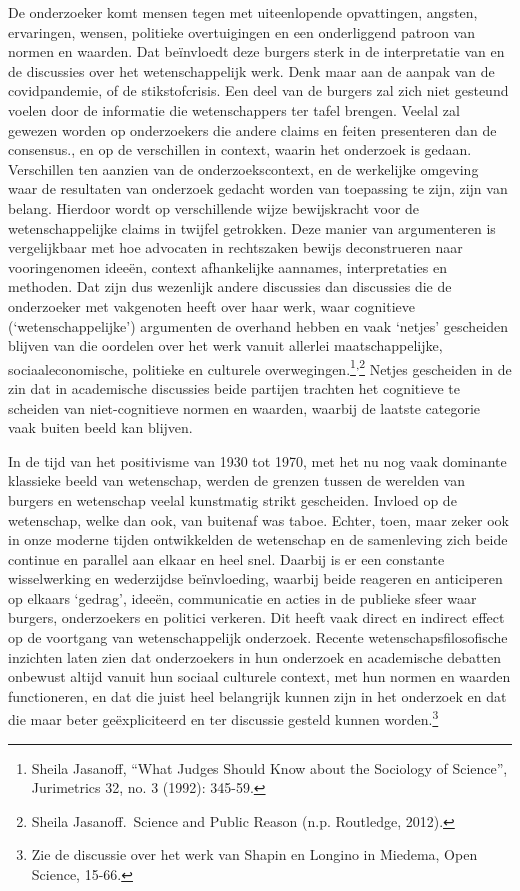 \documentclass[empirical, authordate, ]{new-jote-article}
\begin{document}
	De onderzoeker komt mensen tegen met uiteenlopende opvattingen, angsten, ervaringen, wensen, politieke overtuigingen en een onderliggend patroon van normen en waarden. Dat beïnvloedt deze burgers sterk in de interpretatie van en de discussies over het wetenschappelijk werk. Denk maar aan de aanpak van de covidpandemie, of de stikstofcrisis. Een deel van de burgers zal zich niet gesteund voelen door de informatie die wetenschappers ter tafel brengen. Veelal zal gewezen worden op onderzoekers die andere claims en feiten presenteren dan de consensus., en op de verschillen in context, waarin het onderzoek is gedaan. Verschillen ten aanzien van de onderzoekscontext, en de werkelijke omgeving waar de resultaten van onderzoek gedacht worden van toepassing te zijn, zijn van belang. Hierdoor wordt op verschillende wijze bewijskracht voor de wetenschappelijke claims in twijfel getrokken. Deze manier van argumenteren is vergelijkbaar met hoe advocaten in rechtszaken bewijs deconstrueren naar vooringenomen ideeën, context afhankelijke aannames, interpretaties en methoden. Dat zijn dus wezenlijk andere discussies dan discussies die de onderzoeker met vakgenoten heeft over haar werk, waar cognitieve (‘wetenschappelijke') argumenten de overhand hebben en vaak ‘netjes' gescheiden blijven van die oordelen over het werk vanuit allerlei maatschappelijke, sociaaleconomische, politieke en culturele overwegingen.\footnote{Sheila Jasanoff, “What Judges Should Know about the Sociology of Science”, Jurimetrics 32, no. 3 (1992): 345-59.}\textsuperscript{,}\footnote{Sheila Jasanoff. Science and Public Reason (n.p. Routledge, 2012).} Netjes gescheiden in de zin dat in academische discussies beide partijen trachten het cognitieve te scheiden van niet-cognitieve normen en waarden, waarbij de laatste categorie vaak buiten beeld kan blijven.



	In de tijd van het positivisme van 1930 tot 1970, met het nu nog vaak dominante klassieke beeld van wetenschap, werden de grenzen tussen de werelden van burgers en wetenschap veelal kunstmatig strikt gescheiden. Invloed op de wetenschap, welke dan ook, van buitenaf was taboe. Echter, toen, maar zeker ook in onze moderne tijden ontwikkelden de wetenschap en de samenleving zich beide continue en parallel aan elkaar en heel snel. Daarbij is er een constante wisselwerking en wederzijdse beïnvloeding, waarbij beide reageren en anticiperen op elkaars ‘gedrag', ideeën, communicatie en acties in de publieke sfeer waar burgers, onderzoekers en politici verkeren. Dit heeft vaak direct en indirect effect op de voortgang van wetenschappelijk onderzoek. Recente wetenschapsfilosofische inzichten laten zien dat onderzoekers in hun onderzoek en academische debatten onbewust altijd vanuit hun sociaal culturele context, met hun normen en waarden functioneren, en dat die juist heel belangrijk kunnen zijn in het onderzoek en dat die maar beter geëxpliciteerd en ter discussie gesteld kunnen worden.\footnote{Zie de discussie over het werk van Shapin en Longino in Miedema, Open Science, 15-66.}
\end{document}
